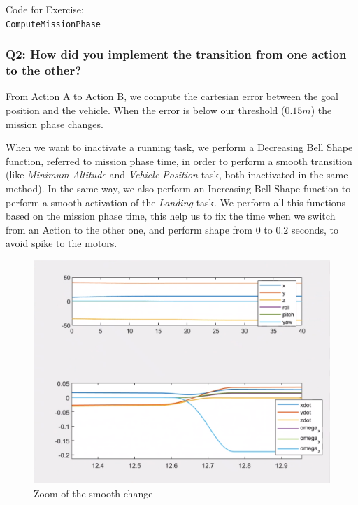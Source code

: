 \documentclass{article}
\begin{document}


\colorbox{mygray}
{\parbox{0.9\textwidth}{Code for Exercise: \\
\texttt{ComputeMissionPhase}\\
}}

\subsubsection{Q2: How did you implement the transition from one action to the other?}

From Action A to Action B, we compute the cartesian error between the goal position and the vehicle. When the error is below our threshold ($0.15m$) the mission phase changes. 

When we want to inactivate a running task, we perform a Decreasing Bell Shape function, referred to mission phase time, in order to perform a smooth transition (like \textit{Minimum Altitude} and \textit{Vehicle Position} task, both inactivated in the same method). In the same way, we also perform an Increasing Bell Shape function to perform a smooth activation of the \textit{Landing} task. We perform all this functions based on the mission phase time, this help us to fix the time when we switch from an Action to the other one, and perform shape from $0$ to $0.2$ seconds, to avoid spike to the motors.
\begin{figure}[!htb]
    \centering
    \includegraphics[scale=0.25]{222_smooth_ppdot.png}
    \caption{Zoom of the smooth change}
    \label{images_2_3_1}
\end{figure}
\end{document}
